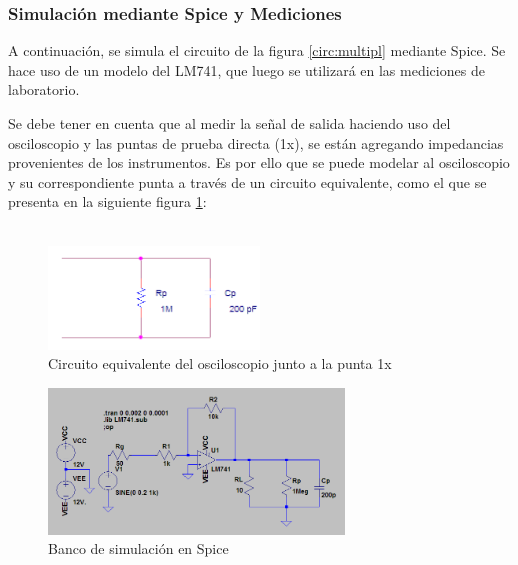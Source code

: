 \subsubsection{Simulación mediante Spice y Mediciones}
A continuación, se simula el circuito de la figura \ref{circ:multipl} mediante Spice. Se hace uso de un modelo del LM741, que luego se utilizará en las mediciones de laboratorio.

Se debe tener en cuenta que al medir la señal de salida haciendo uso del osciloscopio y las puntas de prueba directa (1x), se están agregando impedancias provenientes de los instrumentos. Es por ello que se puede modelar al osciloscopio y su correspondiente punta a través de un circuito equivalente, como el que se presenta en la siguiente figura \ref{circ:multipl_punta1x}:\\\\

\begin{figure}[h]
  \centering
      \includegraphics[width=0.5\textwidth]{gfx/fig2.png}
  \caption{Circuito equivalente del osciloscopio junto a la punta 1x}
  \label{circ:multipl_punta1x}
\end{figure}        


\begin{figure}[H]
  \centering
      \includegraphics[width=0.7\textwidth]{gfxhernan/fig23.PNG}
  \caption{Banco de simulación en Spice}
  \label{circ:multipl_banco_sim}
\end{figure}        

